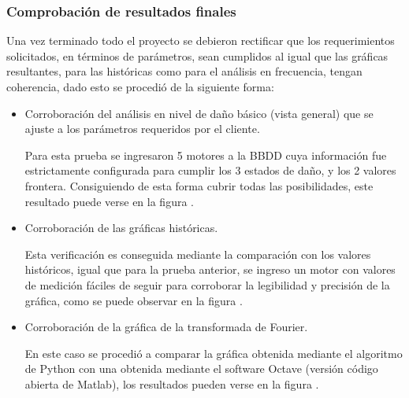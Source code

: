 \subsubsection{Comprobación de resultados finales}
Una vez terminado todo el proyecto se debieron rectificar que los requerimientos
solicitados, en términos de parámetros, sean cumplidos al igual que las gráficas
resultantes, para las históricas como para el análisis en frecuencia, tengan
coherencia, dado esto se procedió de la siguiente forma:

\begin{itemize}
    \item Corroboración del análisis en nivel de daño básico (vista general)
        que se ajuste a los parámetros requeridos por el cliente.

        Para esta prueba se ingresaron 5 motores a la BBDD cuya información fue
        estrictamente configurada para cumplir los 3 estados de daño, y los
        2 valores frontera. Consiguiendo de esta forma cubrir todas las
        posibilidades, este resultado puede verse en la figura .

    \item Corroboración de las gráficas históricas.

        Esta verificación es conseguida mediante la comparación con los valores
        históricos, igual que para la prueba anterior, se ingreso un motor
        con valores de medición fáciles de seguir para corroborar la legibilidad
        y precisión de la gráfica, como se puede observar en la figura .

    \item Corroboración de la gráfica de la transformada de Fourier.

        En este caso se procedió a comparar la gráfica obtenida mediante el
        algoritmo de Python con una obtenida mediante el software Octave (versión
        código abierta de Matlab), los resultados pueden verse en la figura .
\end{itemize}


